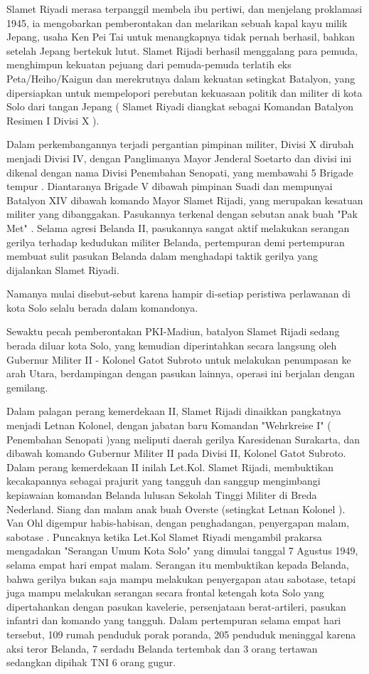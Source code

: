 Slamet Riyadi merasa terpanggil membela ibu pertiwi, dan menjelang proklamasi 1945,  ia mengobarkan pemberontakan dan melarikan sebuah kapal kayu milik Jepang, usaha Ken Pei Tai untuk menangkapnya tidak pernah berhasil,  bahkan setelah Jepang bertekuk lutut. Slamet Rijadi berhasil menggalang para pemuda, menghimpun kekuatan pejuang dari pemuda-pemuda terlatih eks Peta/Heiho/Kaigun dan merekrutnya dalam kekuatan setingkat Batalyon,  yang dipersiapkan untuk mempelopori perebutan kekuasaan politik dan militer di kota Solo dari tangan Jepang ( Slamet Riyadi diangkat sebagai Komandan Batalyon Resimen I Divisi X ).

Dalam perkembangannya terjadi pergantian pimpinan militer,  Divisi X dirubah menjadi Divisi IV, dengan Panglimanya Mayor Jenderal Soetarto dan divisi ini dikenal dengan nama Divisi Penembahan Senopati, yang membawahi 5 Brigade tempur . Diantaranya Brigade V dibawah pimpinan Suadi dan mempunyai Batalyon XIV dibawah komando Mayor Slamet Rijadi,  yang merupakan kesatuan militer yang dibanggakan. Pasukannya terkenal dengan sebutan anak buah "Pak Met" . Selama agresi Belanda II,  pasukannya sangat aktif melakukan serangan gerilya terhadap kedudukan militer Belanda, pertempuran demi pertempuran membuat sulit pasukan Belanda dalam menghadapi taktik gerilya yang dijalankan Slamet Riyadi. 

Namanya mulai disebut-sebut karena hampir di-setiap peristiwa perlawanan di kota Solo selalu berada dalam komandonya.

Sewaktu pecah pemberontakan PKI-Madiun, batalyon Slamet Rijadi sedang berada diluar kota Solo, yang kemudian diperintahkan secara langsung oleh Gubernur Militer II - Kolonel Gatot Subroto untuk melakukan penumpasan ke arah Utara, berdampingan dengan pasukan lainnya, operasi ini berjalan dengan gemilang.

Dalam palagan perang kemerdekaan II, Slamet Rijadi dinaikkan pangkatnya menjadi Letnan Kolonel, dengan jabatan baru Komandan "Wehrkreise I" ( Penembahan Senopati )yang meliputi daerah gerilya Karesidenan Surakarta, dan dibawah komando Gubernur Militer II pada Divisi II,  Kolonel Gatot Subroto. Dalam perang kemerdekaan II inilah Let.Kol. Slamet Rijadi, membuktikan kecakapannya sebagai prajurit yang tangguh dan sanggup mengimbangi kepiawaian komandan Belanda lulusan Sekolah Tinggi Militer di Breda Nederland. Siang dan malam anak buah Overste (setingkat Letnan Kolonel ). Van Ohl digempur habis-habisan, dengan penghadangan, penyergapan malam, sabotase . Puncaknya ketika Let.Kol Slamet Riyadi mengambil prakarsa mengadakan "Serangan Umum Kota Solo" yang dimulai tanggal 7 Agustus 1949, selama empat hari empat malam. Serangan itu membuktikan kepada Belanda, bahwa gerilya bukan saja mampu melakukan penyergapan atau sabotase, tetapi juga mampu melakukan serangan secara frontal ketengah kota Solo yang dipertahankan dengan pasukan kavelerie, persenjataan berat-artileri, pasukan infantri dan komando yang tangguh. Dalam pertempuran selama empat hari tersebut, 109 rumah penduduk porak poranda, 205 penduduk meninggal karena aksi teror Belanda,  7 serdadu Belanda tertembak dan 3 orang tertawan sedangkan dipihak TNI 6 orang gugur.

